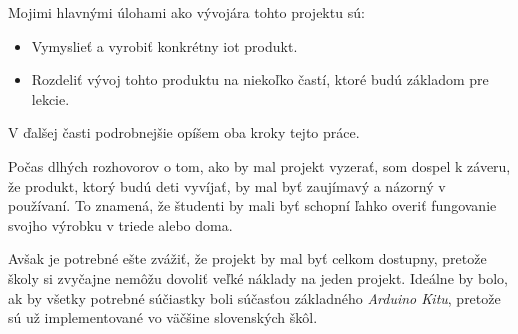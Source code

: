 Mojimi hlavnými úlohami ako vývojára tohto projektu sú:
\begin{itemize}
    \item Vymyslieť a vyrobiť konkrétny \gls{iot} produkt.
    \item Rozdeliť vývoj tohto produktu na niekoľko častí, ktoré budú základom pre lekcie.
\end{itemize}
V ďalšej časti podrobnejšie opíšem oba kroky tejto práce.

Počas dlhých rozhovorov o tom, ako by mal projekt vyzerať, som dospel k záveru, že produkt, ktorý budú deti vyvíjať, by mal byť zaujímavý a názorný v používaní. To znamená, že študenti by mali byť schopní ľahko overiť fungovanie svojho výrobku v triede alebo doma.

Avšak je potrebné ešte zvážiť, že projekt by mal byť celkom dostupny, pretože školy si zvyčajne nemôžu dovoliť veľké náklady na jeden projekt. Ideálne by bolo, ak by všetky potrebné súčiastky boli súčasťou základného \textit{Arduino Kitu}, pretože sú už implementované vo väčšine slovenských škôl.

